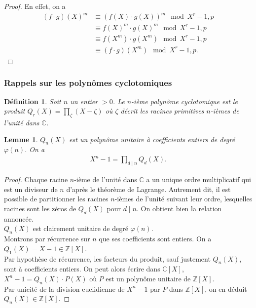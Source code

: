 \documentclass[11pt]{article}
\newtheorem{lemm}{Lemme}[subsection]
\newtheorem{defi}{Définition}[subsection]
\begin{document}
\begin{small}
\begin{proof}
En effet, on a
\begin{align*}
(f \cdot g )(X)^m &\equiv (f(X) \cdot g(X))^m \mod X^r-1,p\\
&\equiv f(X)^m \cdot g(X)^m \mod X^r-1,p\\
&\equiv f(X^m) \cdot g(X^m) \mod X^r-1,p\\
&\equiv (f \cdot g)(X^m) \mod X^r-1,p.
\end{align*}
\end{proof}
\end{small}

\subsubsection{Rappels sur les polynômes cyclotomiques}

\begin{defi}
Soit $n$ un entier $>0$. Le $n$-ième polynôme cyclotomique est le produit $Q_r(X)=\prod_{\zeta}^{} (X-\zeta)$ où $\zeta$ décrit les racines primitives $n$-ièmes de l'unité dans $\mathbb{C}$.
\end{defi}

\begin{lemm}
$Q_n(X)$ est un polynôme unitaire à coefficients entiers de degré $\varphi(n)$. On a
\begin{align*}
X^n-1=\prod_{d \mid n}^{} Q_d(X).
\end{align*}
\end{lemm}

\begin{small}
\begin{proof}
Chaque racine $n$-ième de l'unité dans $\mathbb{C}$ a un unique ordre multiplicatif qui est un diviseur de $n$ d'après le théorème de Lagrange. Autrement dit, il est possible de partitionner les racines $n$-ièmes de l'unité suivant leur ordre, lesquelles racines sont les zéros de $Q_d(X)$ pour $d \mid n$. On obtient bien la relation annoncée.\\

\noindent
$Q_n(X)$ est clairement unitaire de degré $\varphi(n)$.\\

\noindent
Montrons par récurrence sur $n$ que ses coefficients sont entiers. On a $Q_1(X) =X-1 \in \mathbb{Z}[X]$.\\
Par hypothèse de récurrence, les facteurs du produit, sauf justement $Q_n(X)$, sont à coefficients entiers. On peut alors écrire dans $\mathbb{C}[X]$, $X^n-1=Q_n(X) \cdot P(X)$ où $P$ est un polynôme unitaire de $\mathbb{Z}[X]$.\\

\noindent
Par unicité de la division euclidienne de $X^n-1$ par $P$ dans $\mathbb{Z}[X]$, on en déduit $Q_n(X) \in \mathbb{Z}[X]$.
\end{proof}
\end{small}
\end{document}

